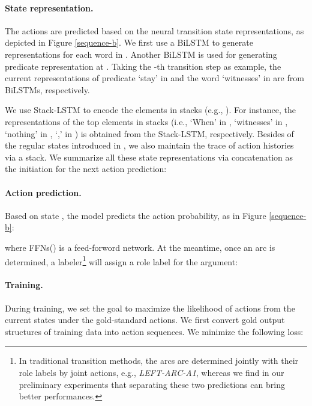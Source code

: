 \documentclass[letterpaper]{article} \usepackage{aaai21}  \usepackage{times}  \usepackage{helvet} \usepackage{courier}  \usepackage[hyphens]{url}  \usepackage{graphicx} \urlstyle{rm} \def\UrlFont{\rm}  \usepackage{natbib}  \usepackage{caption}
\begin{document}
\begin{CJK}{UTF8}{gbsn}
\paragraph{State representation.}


The actions are predicted based on the neural transition state representations, as depicted in Figure \ref{sequence-b}.
We first use a BiLSTM to generate  representations  for each word  in .
Another BiLSTM is used for generating predicate representation  at .
Taking the -th transition step as example, the current representations of predicate `stay' in  and the word `witnesses' in  are from BiLSTMs, respectively.


We use Stack-LSTM \cite{ZhangQZLJ19,YuanJT19} to encode the elements in stacks (e.g., ).
For instance, the representations of the top elements in stacks (i.e., `When' in , `witnesses' in , `nothing' in , `,' in ) is obtained from the Stack-LSTM, respectively.
Besides of the regular states introduced in , we also maintain the trace of action histories  via a stack.
We summarize all these state representations via concatenation as the initiation for the next action prediction: 




\paragraph{Action prediction.}
Based on state , the model predicts the action probability, as in Figure \ref{sequence-b}:

where FFNs() is a feed-forword network.
At the meantime, once an arc is determined,
a labeler\footnote{
In traditional transition methods, the arcs are determined jointly with their role labels by joint actions, e.g., \emph{LEFT-ARC-A1}, whereas we find in our preliminary experiments that separating these two predictions can bring better performances.
}
will assign a role label for the argument:







\paragraph{Training.}
During training, we set the goal to maximize the likelihood of actions from the current states under the gold-standard actions.
We first convert gold output structures of training data into action sequences.
We minimize the following loss:


\end{CJK}
\end{document}
